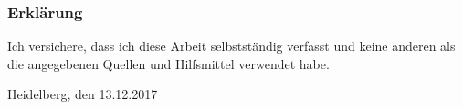   
\subsubsection*{Erklärung}\label{sub:Erklärung}

Ich versichere, dass ich diese Arbeit selbstständig verfasst und keine 
anderen als die angegebenen Quellen und Hilfsmittel verwendet habe.

\vspace{2\baselineskip}

Heidelberg, den 13.12.2017 \hspace{5em} \hrulefill{}



